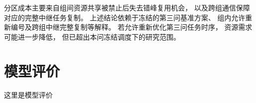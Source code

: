 \documentclass[bwprint]{gmcmthesis}
\begin{document}
分区成本主要来自组间资源共享被禁止后失去错峰复用机会，
以及跨组通信保障对应的完整中继任务复制。
上述结论依赖于冻结的第三问基准方案、
组内允许重新编号及跨组中继完整复制等解释。
若允许重新优化第三问任务时序，
资源需求可能进一步降低，
但已超出本问冻结调度下的研究范围。

\section{模型评价}

这里是模型评价




\cite{mittelbach_latex_2004,wright_latex3_2009,beeton_unicode_2008,vieth_experiences_2009}



\end{document}
